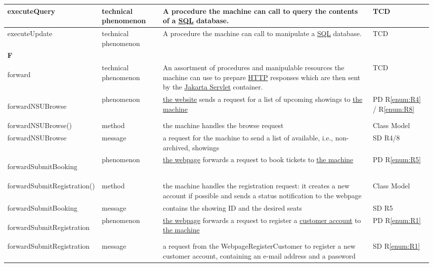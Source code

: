 \documentclass[a4paper,10pt,titlepage,bibtotoc,bibtotocnumbered]{scrreprt}
\begin{document}
\begin{longtable}{|p{4.75cm}|p{3cm}|p{5cm}|l|}
\hline
executeQuery & technical phenomenon & A procedure the machine can call to query the contents of a \href{https://www.mysql.com/products/enterprise/techspec.html}{SQL} database. & TCD\\
\hline
executeUpdate & technical phenomenon & A procedure the machine can call to manipulate a \href{https://www.mysql.com/products/enterprise/techspec.html}{SQL} database. & TCD\\
\hline
\multicolumn{4}{|l|}{\textbf{F}}\\
\hline
\hypertarget{glossary:forward}{forward} & technical phenomenon & An assortment of procedures and manipulable resources the machine can use to prepare \href{https://datatracker.ietf.org/doc/html/rfc9112}{HTTP} responses which are then sent by the \href{https://jakarta.ee/specifications/servlet/}{Jakarta Servlet} container. & TCD\\
\hline
\hypertarget{glossary:forwardNSUBrowse}{forwardNSUBrowse} & phenomenon & \hyperlink{glossary:WebPageNonStaffUserBrowse}{the website} sends a request for a list of upcoming showings to \hyperlink{glossary:UDEK-NonStaffUserBrowse}{the machine} & PD R\ref{enum:R4} / R\ref{enum:R8}\\
\hline
forwardNSUBrowse() & method & the machine handles the browse request & Class Model\\
\hline
forwardNSUBrowse & message & a request for the machine to send a list of available, i.e., non-archived, showings & SD R4/8\\
\hline
\hypertarget{glossary:forwardSubmitBooking}{forwardSubmitBooking} & phenomenon & \hyperlink{glossary:WebpageBookTickets}{the webpage} forwards a request to book tickets to \hyperlink{glossary:UDEKino}{the machine} & PD R\ref{enum:R5}\\
\hline
forwardSubmitRegistration() & method & the machine handles the registration request: it creates a new account if possible and sends a status notification to the webpage & Class Model\\
\hline
forwardSubmitBooking & message & contains the showing ID and the desired seats & SD R5\\
\hline
\hypertarget{glossary:forwardSubmitRegistration}{forwardSubmitRegistration} & phenomenon & \hyperlink{glossary:WebpageRegisterCustomer}{the webpage} forwards a request to register a \hyperlink{glossary:Customer}{customer account} to \hyperlink{glossary:UDEKino}{the machine} & PD R\ref{enum:R1}\\
\hline
forwardSubmitRegistration & message & a request from the WebpageRegisterCustomer to register a new customer account, containing an e-mail address and a password & SD R\ref{enum:R1}\\

\end{longtable}
\end{document}
